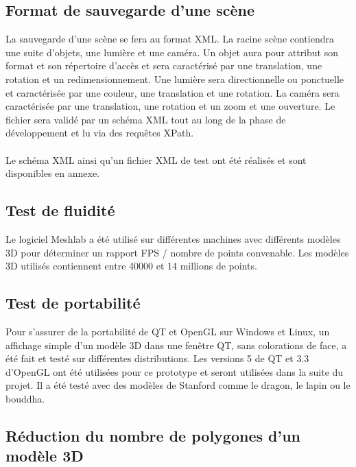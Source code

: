 \subsection{Format de sauvegarde d'une scène}

La sauvegarde d’une scène se fera au format XML. La racine scène contiendra une suite d’objets, une lumière et une caméra. Un objet aura pour attribut son format et son répertoire d’accès et sera caractérisé par une translation, une rotation et un redimensionnement. Une lumière sera directionnelle ou ponctuelle et caractérisée par une couleur, une translation et une rotation. La caméra sera caractérisée par une translation, une rotation et un zoom et une ouverture. Le fichier sera validé par un schéma XML tout au long de la phase de développement et lu via des requêtes XPath.

\paragraph{}
Le schéma XML ainsi qu’un fichier XML de test ont été réalisés et sont disponibles en annexe.

\subsection{Test de fluidité}

Le logiciel Meshlab a été utilisé sur différentes machines avec différents modèles 3D pour déterminer un rapport FPS / nombre de points convenable. Les modèles 3D utilisés contiennent entre 40000 et 14 millions de points.

\subsection{Test de portabilité}

Pour s’assurer de la portabilité de QT et OpenGL sur Windows et Linux, un affichage simple d’un modèle 3D dans une fenêtre QT, sans colorations de face, a été fait et testé sur différentes distributions. Les versions 5 de QT et 3.3 d’OpenGL ont été utilisées pour ce prototype et seront utilisées dans la suite du projet. Il a été testé avec des modèles de Stanford comme le dragon, le lapin ou le bouddha.

\subsection{Réduction du nombre de polygones d’un modèle 3D}

